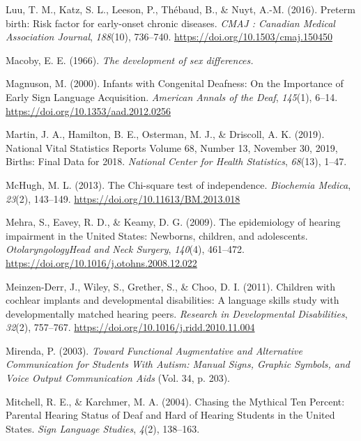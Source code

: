 \documentclass[english,man]{apa6}
\begin{document}
\leavevmode\hypertarget{ref-luu2016}{}%
Luu, T. M., Katz, S. L., Leeson, P., Thébaud, B., \& Nuyt, A.-M. (2016). Preterm birth: Risk factor for early-onset chronic diseases. \emph{CMAJ : Canadian Medical Association Journal}, \emph{188}(10), 736--740. \url{https://doi.org/10.1503/cmaj.150450}

\leavevmode\hypertarget{ref-macoby1966}{}%
Macoby, E. E. (1966). \emph{The development of sex differences.}

\leavevmode\hypertarget{ref-magnuson2000}{}%
Magnuson, M. (2000). Infants with Congenital Deafness: On the Importance of Early Sign Language Acquisition. \emph{American Annals of the Deaf}, \emph{145}(1), 6--14. \url{https://doi.org/10.1353/aad.2012.0256}

\leavevmode\hypertarget{ref-martin2019}{}%
Martin, J. A., Hamilton, B. E., Osterman, M. J., \& Driscoll, A. K. (2019). National Vital Statistics Reports Volume 68, Number 13, November 30, 2019, Births: Final Data for 2018. \emph{National Center for Health Statistics}, \emph{68}(13), 1--47.

\leavevmode\hypertarget{ref-mchugh2013}{}%
McHugh, M. L. (2013). The Chi-square test of independence. \emph{Biochemia Medica}, \emph{23}(2), 143--149. \url{https://doi.org/10.11613/BM.2013.018}

\leavevmode\hypertarget{ref-mehra2009}{}%
Mehra, S., Eavey, R. D., \& Keamy, D. G. (2009). The epidemiology of hearing impairment in the United States: Newborns, children, and adolescents. \emph{OtolaryngologyHead and Neck Surgery}, \emph{140}(4), 461--472. \url{https://doi.org/10.1016/j.otohns.2008.12.022}

\leavevmode\hypertarget{ref-meinzen-derr2011}{}%
Meinzen-Derr, J., Wiley, S., Grether, S., \& Choo, D. I. (2011). Children with cochlear implants and developmental disabilities: A language skills study with developmentally matched hearing peers. \emph{Research in Developmental Disabilities}, \emph{32}(2), 757--767. \url{https://doi.org/10.1016/j.ridd.2010.11.004}

\leavevmode\hypertarget{ref-mirenda2003}{}%
Mirenda, P. (2003). \emph{Toward Functional Augmentative and Alternative Communication for Students With Autism: Manual Signs, Graphic Symbols, and Voice Output Communication Aids} (Vol. 34, p. 203).

\leavevmode\hypertarget{ref-mitchell2004}{}%
Mitchell, R. E., \& Karchmer, M. A. (2004). Chasing the Mythical Ten Percent: Parental Hearing Status of Deaf and Hard of Hearing Students in the United States. \emph{Sign Language Studies}, \emph{4}(2), 138--163.
\end{document}
